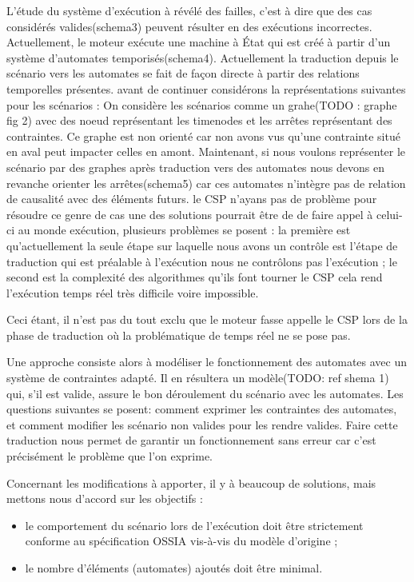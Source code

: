 L'étude du système d'exécution à révélé des failles, c'est à dire que des cas considérés valides(schema3) peuvent résulter en des exécutions incorrectes.
 Actuellement, le moteur exécute une machine à État qui est créé à partir d'un système d'automates temporisés(schema4). Actuellement la traduction depuis le scénario vers les automates se fait de façon directe à partir des relations temporelles présentes.  avant de continuer considérons la représentations suivantes pour les scénarios :
On considère les scénarios comme un grahe(TODO : graphe fig 2) avec des noeud représentant les \glspl{timenode} et les arrêtes représentant des contraintes. Ce graphe est non orienté car non avons vus qu'une contrainte situé en aval peut impacter celles en amont.
Maintenant, si nous voulons représenter le scénario par des graphes après traduction vers des automates nous devons en revanche orienter les arrêtes(schema5) car ces automates n'intègre pas de relation de causalité avec des éléments futurs.  le CSP n'ayans pas de problème pour résoudre ce genre de cas une des solutions pourrait être de de faire appel à celui-ci au monde exécution,  plusieurs problèmes se posent :  la première est qu'actuellement la seule étape sur laquelle nous avons un contrôle est l'étape de traduction qui est préalable à l'exécution nous ne contrôlons pas l'exécution ; le second est la complexité des algorithmes qu'ils font tourner le CSP cela rend l'exécution temps réel très difficile voire impossible.

Ceci étant, il n'est pas du tout exclu que le moteur fasse appelle le CSP lors de la phase de traduction où la problématique de temps réel ne se pose pas.

Une approche consiste alors à modéliser le fonctionnement des automates avec un système de contraintes adapté. Il en résultera un modèle(TODO: ref shema 1) qui, s'il est valide, assure le bon déroulement du scénario avec les automates. Les questions suivantes se posent: comment exprimer les contraintes des automates, et comment modifier les scénario non valides pour les rendre valides. Faire cette traduction nous permet de garantir un fonctionnement sans erreur car c'est précisément le problème que l'on exprime.

Concernant les modifications à apporter, il y à beaucoup de solutions, mais mettons nous d'accord sur les objectifs : 
\begin{itemize}
\item le comportement du scénario lors de l'exécution doit être strictement conforme au spécification OSSIA vis-à-vis du modèle d'origine ;
\item le nombre d'éléments (automates) ajoutés doit être minimal.
\end{itemize}
